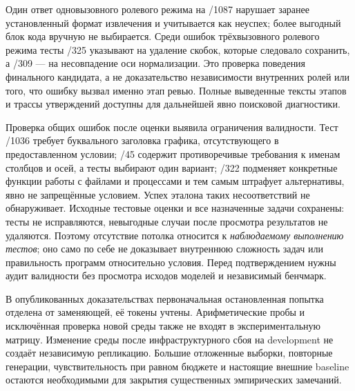 

Один ответ одновызовного ролевого режима на /1087 нарушает заранее установленный формат извлечения и учитывается как неуспех; более выгодный блок кода вручную не выбирается. Среди ошибок трёхвызовного ролевого режима тесты /325 указывают на удаление скобок, которые следовало сохранить, а /309 --- на несовпадение оси нормализации. Это проверка поведения финального кандидата, а не доказательство независимости внутренних ролей или того, что ошибку вызвал именно этап ревью. Полные выведенные тексты этапов и трассы утверждений доступны для дальнейшей явно поисковой диагностики.

Проверка общих ошибок после оценки выявила ограничения валидности. Тест /1036 требует буквального заголовка графика, отсутствующего в предоставленном условии; /45 содержит противоречивые требования к именам столбцов и осей, а тесты выбирают один вариант; /322 подменяет конкретные функции работы с файлами и процессами и тем самым штрафует альтернативы, явно не запрещённые условием. Успех эталона таких несоответствий не обнаруживает. Исходные тестовые оценки и все назначенные задачи сохранены: тесты не исправляются, невыгодные случаи после просмотра результатов не удаляются. Поэтому отсутствие потолка относится к \emph{наблюдаемому выполнению тестов}; оно само по себе не доказывает внутреннюю сложность задач или правильность программ относительно условия. Перед подтверждением нужны аудит валидности без просмотра исходов моделей и независимый бенчмарк.

В опубликованных доказательствах первоначальная остановленная попытка отделена от заменяющей, её токены учтены. Арифметические пробы и исключённая проверка новой среды также не входят в экспериментальную матрицу. Изменение среды после инфраструктурного сбоя на development не создаёт независимую репликацию. Большие отложенные выборки, повторные генерации, чувствительность при равном бюджете и настоящие внешние baseline остаются необходимыми для закрытия существенных эмпирических замечаний.
